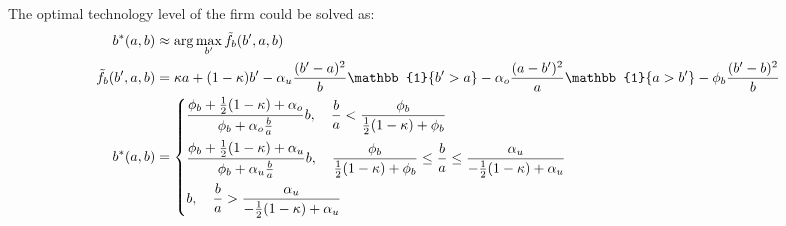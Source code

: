 \documentclass{article}
\newcommand{\1}{\mathbb{1}}
\begin{document}
The optimal technology level of the firm could be solved as: 
\begin{align*}
b^*(a,b) &\approx \arg\max_{b'} \tilde{f}_b(b',a,b) \\
\tilde{f_b}(b',a,b)&=\kappa a+(1-\kappa) b'-\alpha_u\frac{(b'-a)^2}{b}\1\{b'>a\}-\alpha_o\frac{(a-b')^2}{a}\1\{a>b'\}-\phi_b\frac{(b'-b)^2}{b} \\
b^*(a,b) 
&= \begin{dcases}
\frac{\phi_b+\frac{1}{2}(1-\kappa)+\alpha_o}{\phi_b+\alpha_o\frac{b}{a}}b, \quad \frac{b}{a}<\frac{\phi_b}{\frac{1}{2}(1-\kappa)+\phi_b}\\
\frac{\phi_b+\frac{1}{2}(1-\kappa)+\alpha_u}{\phi_b+\alpha_u\frac{b}{a}}b, \quad \frac{\phi_b}{\frac{1}{2}(1-\kappa)+\phi_b}\leq\frac{b}{a}\leq\frac{\alpha_u}{-\frac{1}{2}(1-\kappa)+\alpha_u}  \\
b, \quad \frac{b}{a} >\frac{\alpha_u}{-\frac{1}{2}(1-\kappa)+\alpha_u}
\end{dcases} 
\end{align*}
\end{document}
